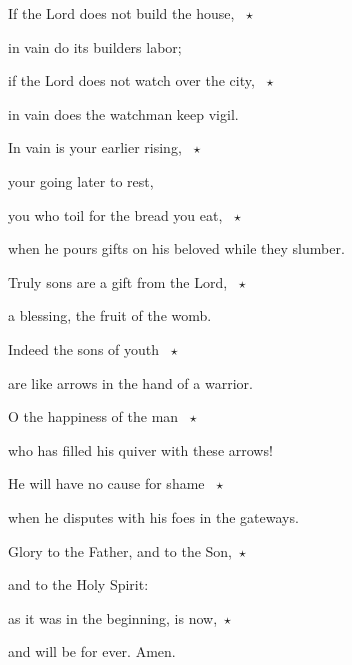 \noindent If the Lord does not build the house, ~$\star$~\nopagebreak

in vain do its builders labor;

\noindent if the Lord does not watch over the city, ~$\star$~\nopagebreak

in vain does the watchman keep vigil.

\noindent In vain is your earlier rising, ~$\star$~\nopagebreak

your going later to rest,

\noindent you who toil for the bread you eat, ~$\star$~\nopagebreak

when he pours gifts on his beloved while they slumber.

\noindent Truly sons are a gift from the Lord, ~$\star$~\nopagebreak

a blessing, the fruit of the womb.

\noindent Indeed the sons of youth ~$\star$~\nopagebreak

are like arrows in the hand of a warrior.

\noindent O the happiness of the man ~$\star$~\nopagebreak

who has filled his quiver with these arrows!

\noindent He will have no cause for shame ~$\star$~\nopagebreak

when he disputes with his foes in the gateways. 

\noindent Glory to the Father, and to the Son,~$\star$~\nopagebreak

and to the Holy Spirit:

\noindent as it was in the beginning, is now,~$\star$~\nopagebreak

and will be for ever. Amen.
